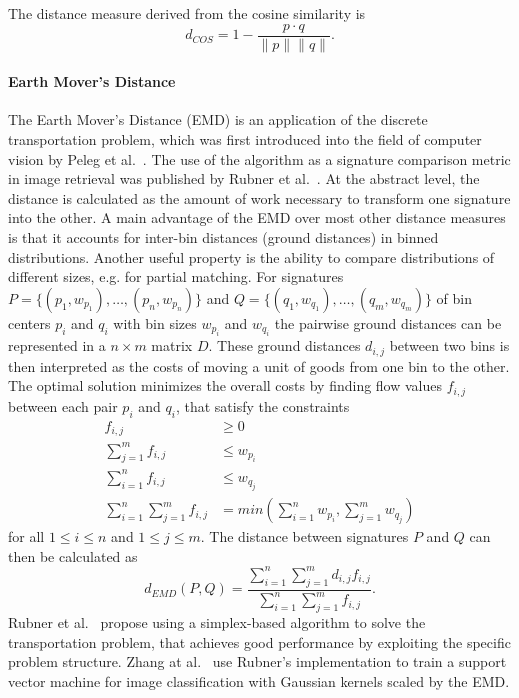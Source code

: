 The distance measure derived from the cosine similarity is
\begin{equation*}
    d_{COS} = 1 - \frac{p \cdot q}{\|p\| \|q\|}.
\end{equation*}

\paragraph{Earth Mover's Distance}

The Earth Mover's Distance (EMD) is an application of the discrete
transportation problem, which was first introduced into the field of computer
vision by Peleg et al.\ \autocite{peleg_unified_1989}. The use of the algorithm
as a signature comparison metric in image retrieval was published by Rubner et
al.\ \autocite{rubner_metric_1998}. At the abstract level, the distance is
calculated as the amount of work necessary to transform one signature into the
other.  A main advantage of the EMD over most other distance measures is that
it accounts for inter-bin distances (ground distances) in binned distributions.
Another useful property is the ability to compare distributions of different
sizes, e.g. for partial matching.
For signatures $P = \{ (p_1, w_{p_1}), \dots, (p_n, w_{p_n}) \}$ and $Q = \{
(q_1, w_{q_1}), \dots, (q_m, w_{q_m}) \}$ of bin centers $p_i$ and $q_i$ with
bin sizes $w_{p_i}$ and $w_{q_i}$ the pairwise ground distances can be
represented in a $n \times m$ matrix $D$.
These ground distances $d_{i, j}$ between two bins is then interpreted as the
costs of moving a unit of goods from one bin to the other. The optimal solution
minimizes the overall costs by finding flow values $f_{i, j}$ between each pair
$p_i$ and $q_i$, that satisfy the constraints
\begin{align*}
    f_{i, j} & \geq 0 \\
    \sum_{j=1}^m f_{i, j} & \leq w_{p_i} \\
    \sum_{i=1}^n f_{i, j} & \leq w_{q_j} \\
    \sum_{i=1}^n \sum_{j=1}^m f_{i, j} & = min \left( \sum_{i=1}^n w_{p_i}, \sum_{j=1}^m w_{q_j} \right)
\end{align*}
for all $1 \leq i \leq n$ and $1 \leq j \leq m$.
The distance between signatures $P$ and $Q$ can then be calculated as
\begin{equation*}
    d_{EMD}(P, Q) = \frac{\displaystyle\sum_{i=1}^n \sum_{j=1}^m d_{i, j} f_{i, j}}{\displaystyle\sum_{i=1}^n \sum_{j=1}^m f_{i, j}}.
\end{equation*}
Rubner et al.\ \autocite{rubner_metric_1998} propose using a simplex-based
algorithm to solve the transportation problem, that achieves good performance
by exploiting the specific problem structure. Zhang at al.\
\autocite{zhang_local_2006} use Rubner's implementation to train a support
vector machine for image classification with Gaussian kernels scaled by the
EMD.

